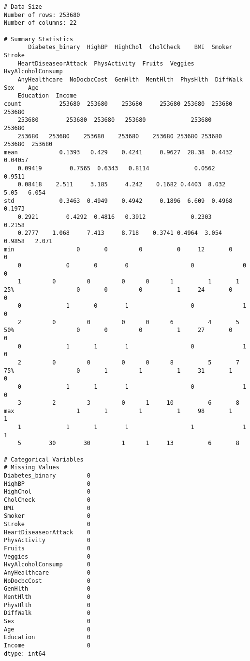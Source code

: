 \documentclass[11pt]{article}
\begin{document}
\begin{Verbatim}[tabsize=4]
# Data Size
Number of rows: 253680
Number of columns: 22

# Summary Statistics
       Diabetes_binary  HighBP  HighChol  CholCheck    BMI  Smoker  Stroke
	HeartDiseaseorAttack  PhysActivity  Fruits  Veggies  HvyAlcoholConsump
	AnyHealthcare  NoDocbcCost  GenHlth  MentHlth  PhysHlth  DiffWalk    Sex    Age
	Education  Income
count           253680  253680    253680     253680 253680  253680  253680
	253680        253680  253680   253680             253680         253680
	253680   253680    253680    253680    253680 253680 253680     253680  253680
mean            0.1393   0.429    0.4241     0.9627  28.38  0.4432 0.04057
	0.09419        0.7565  0.6343   0.8114             0.0562         0.9511
	0.08418    2.511     3.185     4.242    0.1682 0.4403  8.032       5.05   6.054
std             0.3463  0.4949    0.4942     0.1896  6.609  0.4968  0.1973
	0.2921        0.4292  0.4816   0.3912             0.2303         0.2158
	0.2777    1.068     7.413     8.718    0.3741 0.4964  3.054     0.9858   2.071
min                  0       0         0          0     12       0       0
	0             0       0        0                  0              0            0
	1         0         0         0      0      1          1       1
25%                  0       0         0          1     24       0       0
	0             1       0        1                  0              1            0
	2         0         0         0      0      6          4       5
50%                  0       0         0          1     27       0       0
	0             1       1        1                  0              1            0
	2         0         0         0      0      8          5       7
75%                  0       1         1          1     31       1       0
	0             1       1        1                  0              1            0
	3         2         3         0      1     10          6       8
max                  1       1         1          1     98       1       1
	1             1       1        1                  1              1            1
	5        30        30         1      1     13          6       8

# Categorical Variables
# Missing Values
Diabetes_binary         0
HighBP                  0
HighChol                0
CholCheck               0
BMI                     0
Smoker                  0
Stroke                  0
HeartDiseaseorAttack    0
PhysActivity            0
Fruits                  0
Veggies                 0
HvyAlcoholConsump       0
AnyHealthcare           0
NoDocbcCost             0
GenHlth                 0
MentHlth                0
PhysHlth                0
DiffWalk                0
Sex                     0
Age                     0
Education               0
Income                  0
dtype: int64


\end{Verbatim}
\end{document}
